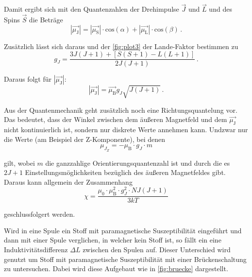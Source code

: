 Damit ergibt sich mit den Quantenzahlen der Drehimpulse $\vec{J}$ und $\vec{L}$ und des Spins $\vec{S}$ die Beträge
\begin{equation*}
        |\vec{\mu_\text{J}}| = |\vec{\mu_\text{S}}| \cdot \text{cos}\left(\alpha \right) + 
        |\vec{\mu_\text{L}}| \cdot \text{cos}\left(\beta \right) \, .
\end{equation*}

Zusätzlich lässt sich daraus und der \autoref{fig:plot3} der Lande-Faktor bestimmen zu
\begin{equation*}
        g_J = \frac{3J(J+1) + [S(S+1) - L(L+1)]} {2 J(J+1)} \, .
        \label{eqn:lande}
\end{equation*}

Daraus folgt für $|\vec{\mu_\text{J}}|$:
\begin{equation}
    |\vec{\mu_\text{J}}| = \vec{\mu_\text{B}} g_J \sqrt{J (J+1)}  \, .
\end{equation}

\noindent
Aus der Quantenmechanik geht zusätzlich noch eine Richtungsquantelung vor. Das bedeutet, dass der Winkel zwischen dem äußeren Magnetfeld und dem $\vec{\mu_\text{J}}$
nicht kontinuierlich ist, sondern nur diskrete Werte annehmen kann. Undzwar nur die Werte (am Beispiel der Z-Komponente), bei denen 
\begin{equation}
        \mu_{J_Z} = - \mu_\text{B} \cdot g_J \cdot m
\end{equation}

\noindent
gilt, wobei $m$ die ganzzahlige Orientierungsquantenzahl ist und durch die es $2J+1$ Einstellungsmöglichkeiten bezüglich des äußeren Magnetfeldes gibt. Daraus kann allgemein der
Zusammenhang 
\begin{equation}
        \chi = \frac{\mu_0 \cdot \mu_\text{B}^2 \cdot g_J^2 \cdot N J (J+1)}{3kT}
        \label{eqn:theo}
\end{equation}

\noindent
geschlussfolgert werden.

\noindent
Wird in eine Spule ein Stoff mit paramagnetische Suszeptibilität eingeführt und dann mit einer Spule verglichen, in welcher kein Stoff ist, so fällt ein eine Induktivitätsdifferenz
$\Delta L$ zwischen den Spulen auf. Dieser Unterschied wird genutzt um Stoff mit paramagnetische Suszeptibilität mit einer Brückenschaltung zu untersuchen.
Dabei wird diese Aufgebaut wie in \autoref{fig:bruecke} dargestellt.

